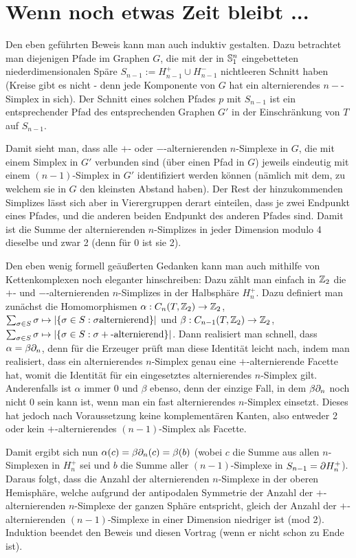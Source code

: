 \message{ !name(OnBorsukUlamsThoerem.tex)}\documentclass[10pt,a4paper]{article}
\begin{document}
\section{Wenn noch etwas Zeit bleibt ... }

Den eben geführten Beweis kann man auch induktiv gestalten. Dazu betrachtet man diejenigen Pfade im Graphen $G$, die mit der in $\mathbb{S}^n_1$ eingebetteten niederdimensionalen Späre $S_{n-1}:=H^+_{n-1}\cup H^-_{n-1}$ nichtleeren Schnitt haben (Kreise gibt es nicht - denn jede Komponente von $G$ hat ein alternierendes $n-$-Simplex in sich). Der Schnitt eines solchen Pfades $p$ mit $S_{n-1}$ ist ein entsprechender Pfad des entsprechenden Graphen $G'$ in der Einschränkung von $T$ auf $S_{n-1}$.

Damit sieht man, dass alle $+$- oder $-$-alternierenden $n$-Simplexe in $G$, die mit einem Simplex in $G'$ verbunden sind (über einen Pfad in $G$) jeweils eindeutig mit einem $(n-1)$-Simplex in $G'$ identifiziert werden können (nämlich mit dem, zu welchem sie in $G$ den kleinsten Abstand haben). Der Rest der hinzukommenden Simplizes lässt sich aber in Vierergruppen derart einteilen, dass je zwei Endpunkt eines Pfades, und die anderen beiden Endpunkt des anderen Pfades sind. Damit ist die Summe der alternierenden $n$-Simplizes in jeder Dimension modulo 4 dieselbe und zwar 2 (denn für 0 ist sie 2).

Den eben wenig formell geäußerten Gedanken kann man auch mithilfe von Kettenkomplexen noch eleganter hinschreiben:
Dazu zählt man einfach in $\mathbb{Z}_2$ die $+$- und $-$-alternierenden $n$-Simplizes in der Halbsphäre $H^+_n$. Dazu definiert man zunächst die Homomorphismen $\alpha:C_n(T,\mathbb{Z}_2)\rightarrow\mathbb{Z}_2$, $\sum_{\sigma\in S}{\sigma}\mapsto\left|\{\sigma\in S:\sigma \text{alternierend}\}\right|$ und $\beta:C_{n-1}(T,\mathbb{Z}_2)\rightarrow\mathbb{Z}_2$,  $\sum_{\sigma\in S}{\sigma}\mapsto\left|\{\sigma\in S:\sigma +\text{-alternierend}\}\right|$. Dann realisiert man schnell, dass $\alpha=\beta\partial_n$, denn für die Erzeuger prüft man diese Identität leicht nach, indem man realisiert, dass ein alternierendes $n$-Simplex genau eine $+$-alternierende Facette hat, womit die Identität für ein eingesetztes alternierendes $n$-Simplex gilt. Anderenfalls ist $\alpha$ immer 0 und $\beta$ ebenso, denn der einzige Fall, in dem $\beta\partial_n$ noch nicht 0 sein kann ist, wenn man ein fast alternierendes $n$-Simplex einsetzt. Dieses hat jedoch nach Voraussetzung keine komplementären Kanten, also entweder 2 oder kein $+$-alternierendes $(n-1)$-Simplex als Facette. 

Damit ergibt sich nun $\alpha(c)=\beta\partial_n(c)=\beta(b)$ (wobei $c$ die Summe aus allen $n$-Simplexen in $H^+_n$ sei und $b$ die Summe aller $(n-1)$-Simplexe in $S_{n-1}=\partial H^+_n$). Daraus folgt, dass die Anzahl der alternierenden $n$-Simplexe in der oberen Hemisphäre, welche aufgrund der antipodalen Symmetrie der Anzahl der $+$-alternierenden $n$-Simplexe der ganzen Sphäre entspricht, gleich der Anzahl der $+$-alternierenden $(n-1)$-Simplexe in einer Dimension niedriger ist (mod 2). Induktion beendet den Beweis und diesen Vortrag (wenn er nicht schon zu Ende ist).
 
\end{document}

